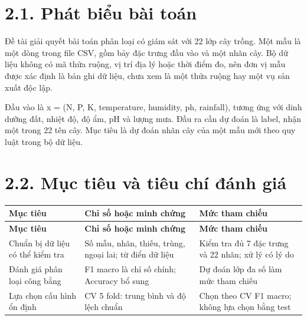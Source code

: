 \section{2.1. Phát biểu bài toán}

Đề tài giải quyết bài toán phân loại có giám sát với 22 lớp cây trồng. Một mẫu là một dòng trong file CSV, gồm bảy đặc trưng đầu vào và một nhãn cây. Bộ dữ liệu không có mã thửa ruộng, vị trí địa lý hoặc thời điểm đo, nên đơn vị mẫu được xác định là bản ghi dữ liệu, chưa xem là một thửa ruộng hay một vụ sản xuất độc lập.


Đầu vào là x = (N, P, K, temperature, humidity, ph, rainfall), tương ứng với dinh dưỡng đất, nhiệt độ, độ ẩm, pH và lượng mưa. Đầu ra cần dự đoán là label, nhận một trong 22 tên cây. Mục tiêu là dự đoán nhãn cây của một mẫu mới theo quy luật trong bộ dữ liệu.


\section{2.2. Mục tiêu và tiêu chí đánh giá}

\begingroup
{}
\label{tab:1}
\fontsize{11.5}{13.5}\selectfont{}
\renewcommand{\arraystretch}{1.15}
\begin{longtable*}{|>{\raggedright\arraybackslash}p{\arrayrulewidth\relax}|>{\raggedright\arraybackslash}p{\arrayrulewidth\relax}|>{\raggedright\arraybackslash}p{\arrayrulewidth\relax}|}
\hline \textbf{Mục tiêu} & \textbf{Chỉ số hoặc minh chứng} & \textbf{Mức tham chiếu} \\ \hline
\endfirsthead
\hline \textbf{Mục tiêu} & \textbf{Chỉ số hoặc minh chứng} & \textbf{Mức tham chiếu} \\ \hline
\endhead
Chuẩn bị dữ liệu có thể kiểm tra & Số mẫu, nhãn, thiếu, trùng, ngoại lai; từ điển dữ liệu & Kiểm tra đủ 7 đặc trưng và 22 nhãn; xử lý có lý do \\ \hline
Đánh giá phân loại công bằng & F1 macro là chỉ số chính; Accuracy bổ sung & Dự đoán lớp đa số làm mức tham chiếu \\ \hline
Lựa chọn cấu hình ổn định & CV 5 fold: trung bình và độ lệch chuẩn & Chọn theo CV F1 macro; không lựa chọn bằng test \\ \hline
\end{longtable*}
\endgroup


